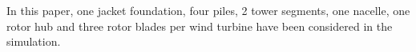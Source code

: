 

In this paper, one jacket foundation, four piles, 2 tower segments, one nacelle, one rotor hub and three rotor blades per wind turbine have been considered in the simulation.


